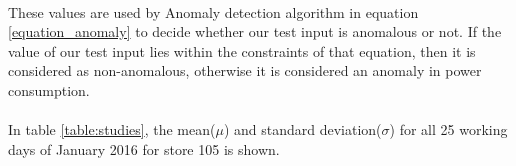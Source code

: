 \documentclass[12pt]{article}
\begin{document}
\paragraph{} These values are used by Anomaly detection algorithm in equation \ref{equation_anomaly} to decide whether our test input is anomalous or not. If the value of our test input lies within the constraints of that equation, then it is considered as non-anomalous, otherwise it is considered an anomaly in power consumption.

\paragraph{} In table \ref{table:studies}, the mean($\mu$) and standard deviation($\sigma$) for all 25 working days of January 2016 for store 105 is shown.  
\end{document}
